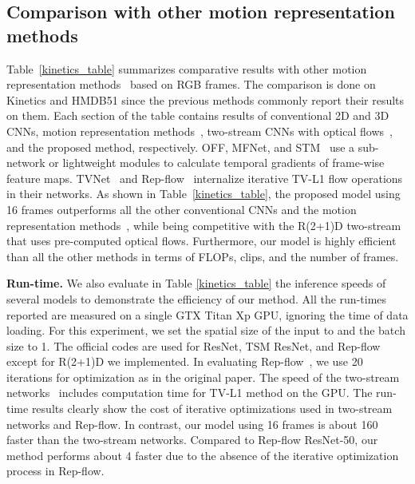 \documentclass[runningheads]{llncs}
\begin{document}
\subsection{Comparison with other motion representation methods}
Table~\ref{kinetics_table} summarizes comparative results with other motion representation methods~\cite{lee2018motion,sun2018optical,fan2018end,piergiovanni2019representation,jiang2019stm} based on RGB frames.
The comparison is done on Kinetics and HMDB51 since the previous methods commonly report their results on them.
Each section of the table contains results of conventional 2D and 3D CNNs, motion representation methods~\cite{lee2018motion,sun2018optical,fan2018end,piergiovanni2019representation,jiang2019stm}, two-stream CNNs with optical flows~\cite{he2016deep,tran2018closer}, and the proposed method, respectively.
OFF, MFNet, and STM~\cite{lee2018motion,sun2018optical,jiang2019stm} use a sub-network or lightweight modules to calculate temporal gradients of frame-wise feature maps.
TVNet~\cite{fan2018end} and Rep-flow~\cite{piergiovanni2019representation} internalize iterative TV-L1 flow operations in their networks.
As shown in Table~\ref{kinetics_table}, the proposed model using 16 frames outperforms all the other conventional CNNs and the motion representation methods~\cite{he2016deep,carreira2017quo,tran2018closer,lee2018motion,sun2018optical,fan2018end,piergiovanni2019representation,jiang2019stm}, while being competitive with the R(2+1)D two-stream~\cite{tran2018closer} that uses pre-computed optical flows.
Furthermore, our model is highly efficient than all the other methods in terms of FLOPs, clips, and the number of frames.


\smallbreak
\noindent
\textbf{Run-time.}
 We also evaluate in Table \ref{kinetics_table} the inference speeds of several models to demonstrate the efficiency of our method.
All the run-times reported are measured on a single GTX Titan Xp GPU, ignoring the time of data loading. For this experiment, 
we set the spatial size of the input to  and the batch size to 1. 
The official codes are used for ResNet, TSM ResNet, and Rep-flow~\cite{he2016deep,lin2019tsm,piergiovanni2019representation} except for R(2+1)D\cite{tran2018closer} we implemented.
In evaluating Rep-flow~\cite{piergiovanni2019representation}, we use 20 iterations for optimization as in the original paper.
The speed of the two-stream networks~\cite{simonyan2014two,tran2018closer} includes computation time for TV-L1 method on the GPU.
The run-time results clearly show the cost of iterative optimizations used in two-stream networks and Rep-flow. 
In contrast, our model using 16 frames is about 160 faster than the two-stream networks.
Compared to Rep-flow ResNet-50, our method performs about 4 faster due to the absence of the iterative optimization process in Rep-flow.
\end{document}
